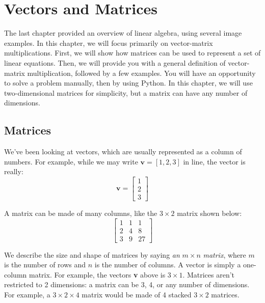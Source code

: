 \chapter{Vectors and Matrices}
  
The last chapter provided an overview of linear algebra, using several image 
examples. In this chapter, we will focus primarily on vector-matrix 
multiplications. First, we will show how matrices can be used to represent a 
set of linear equations. Then, we will provide you with a general definition 
of vector-matrix multiplication, followed by a few examples. You will have an 
opportunity to solve a problem manually, then by using Python. In this 
chapter, we will use two-dimensional matrices for simplicity, but a matrix can 
have any number of dimensions.  

\section{Matrices}
We've been looking at vectors, which are usually represented as a column of 
numbers. For example, while we may write $\mathbf{v} = \left[ 1, 2, 3 \right]$ 
in line, the vector is really:
$$\mathbf{v} = \begin{bmatrix}
1\\
2\\
3
\end{bmatrix}$$

A matrix can be made of many columns, like the $3 \times 2$ matrix shown below:
$$\begin{bmatrix}
1 & 1 & 1\\
2 & 4 & 8\\
3 & 9 & 27
\end{bmatrix}$$

We describe the size and shape of matrices by saying \textit{an }$m \times 
n$\textit{ matrix}, where $m$ is the number of rows and $n$ is the number of 
columns. A vector is simply a one-column matrix. For example, the vectors 
\textbf{v} above is $3 \times 1$. Matrices aren't restricted to 2 dimensions: 
a matrix can be 3, 4, or any number of dimensions. For example, a $3 \times 2 
\times 4$ matrix would be made of 4 stacked $3 \times 2$ matrices.

